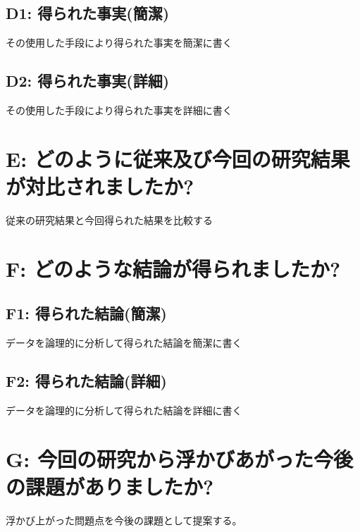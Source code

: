 ﻿\documentclass[a4j,10pt]{jarticle}
\begin{document}
\subsection{D1: 得られた事実(簡潔)} 
その使用した手段により得られた事実を簡潔に書く
%
%
\subsection{D2: 得られた事実(詳細)} 
その使用した手段により得られた事実を詳細に書く
%
%
\section{E: どのように従来及び今回の研究結果が対比されましたか?} 
従来の研究結果と今回得られた結果を比較する
%
%
\section{F: どのような結論が得られましたか?}
\subsection{F1: 得られた結論(簡潔)} 
データを論理的に分析して得られた結論を簡潔に書く
%
%
\subsection{F2: 得られた結論(詳細)} 
データを論理的に分析して得られた結論を詳細に書く
%
%
\section{G: 今回の研究から浮かびあがった今後の課題がありましたか?} 
浮かび上がった問題点を今後の課題として提案する。
%
\end{document}
